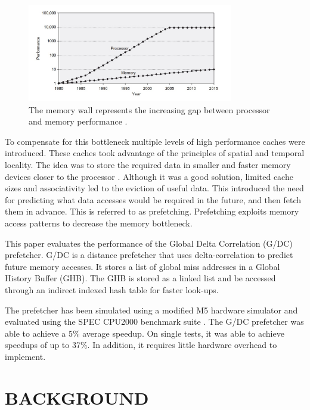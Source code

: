 \documentclass[conference]{IEEEtran}
\begin{document}
\begin{figure}[h]
    \centering
     \includegraphics[width=9cm]{assets/processor-memory-gap.jpg}
    \vspace{-6mm}
    \caption{The memory wall represents the increasing gap between processor and memory performance \cite{b4}.}
    \label{fig:mirror}
\end{figure}

To compensate for this bottleneck multiple levels of high performance caches were introduced. These caches took advantage of the principles of spatial and temporal locality. The idea was to store the required data in smaller and faster memory devices closer to the processor \cite{b7}. Although it was a good solution, limited cache sizes and associativity led to the eviction of useful data. This introduced the need for predicting what data accesses would be required in the future, and then fetch them in advance. This is referred to as prefetching. Prefetching exploits memory access patterns to decrease the memory bottleneck. 

This paper evaluates the performance of the Global Delta Correlation (G/DC) prefetcher. G/DC is a distance prefetcher that uses delta-correlation to predict future memory accesses. It stores a list of global miss addresses in a Global History Buffer (GHB). The GHB is stored as a linked list and be accessed through an indirect indexed hash table for faster look-ups. 

The prefetcher has been simulated using a modified M5 hardware simulator \cite{m5doc} and evaluated using the SPEC CPU2000 benchmark suite \cite{b8}. The G/DC prefetcher was able to achieve a 5\% average speedup. On single tests, it was able to achieve speedups of up to 37\%. In addition, it requires little hardware overhead to implement. 


\section{BACKGROUND}

\end{document}

